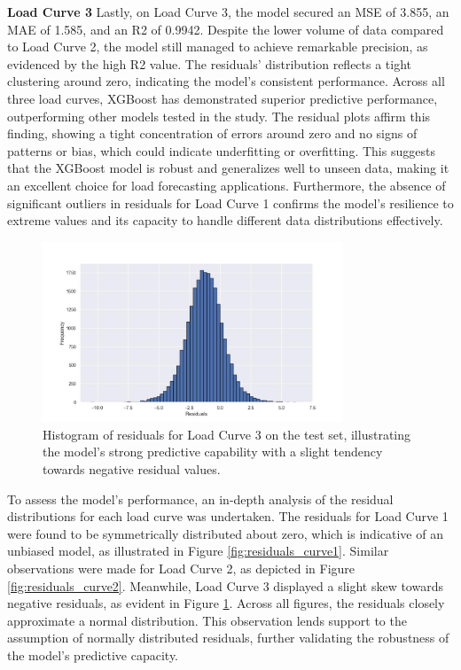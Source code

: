 \documentclass{article} %
\begin{document}
\textbf{Load Curve 3}
Lastly, on Load Curve 3, the model secured an \gls{MSE} of 3.855, an \gls{MAE} of 1.585, and an \gls{R2} of 0.9942. Despite the lower volume of data compared to Load Curve 2, the model still managed to achieve remarkable precision, as evidenced by the high \gls{R2} value. The residuals' distribution reflects a tight clustering around zero, indicating the model's consistent performance.
Across all three load curves, XGBoost has demonstrated superior predictive performance, outperforming other models tested in the study. The residual plots affirm this finding, showing a tight concentration of errors around zero and no signs of patterns or bias, which could indicate underfitting or overfitting. This suggests that the XGBoost model is robust and generalizes well to unseen data, making it an excellent choice for load forecasting applications. Furthermore, the absence of significant outliers in residuals for Load Curve 1 confirms the model's resilience to extreme values and its capacity to handle different data distributions effectively.


\begin{figure}[H]
\centering
\includegraphics[width=0.8\textwidth]{ressources/residuals/erg/lc3/residuals.jpg}
\caption{Histogram of residuals for Load Curve 3 on the test set, illustrating the model's strong predictive capability with a slight tendency towards negative residual values.}
\label{fig:residuals_curve3}
\end{figure}

To assess the model's performance, an in-depth analysis of the residual distributions for each load curve was undertaken. The residuals for Load Curve 1 were found to be symmetrically distributed about zero, which is indicative of an unbiased model, as illustrated in Figure \ref{fig:residuals_curve1}. Similar observations were made for Load Curve 2, as depicted in Figure \ref{fig:residuals_curve2}. Meanwhile, Load Curve 3 displayed a slight skew towards negative residuals, as evident in Figure \ref{fig:residuals_curve3}. Across all figures, the residuals closely approximate a normal distribution. This observation lends support to the assumption of normally distributed residuals, further validating the robustness of the model's predictive capacity.
\end{document}
